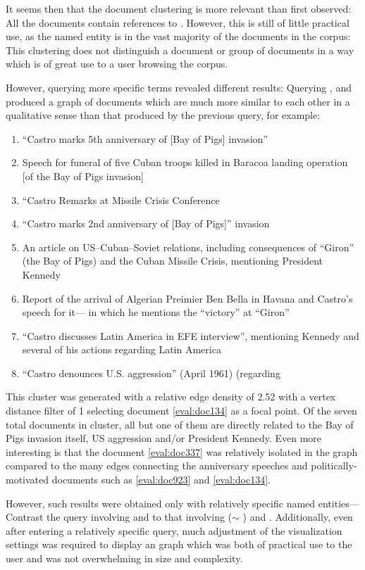 It seems then that the document clustering is more relevant than first observed: All the documents contain references to . However, this is still of little practical use, as the named entity  is in the vast majority of the documents in the corpus: This clustering does not distinguish a document or group of documents in a way which is of great use to a user browsing the corpus.

However, querying more specific terms revealed different results: Querying , and  produced a graph of documents which are much more similar to each other in a qualitative sense than that produced by the previous query, for example:

\begin{enumerate}
\item ``Castro marks 5th anniversary of [Bay of Pigs] invasion'' \label{eval:doc274}
\item Speech for funeral of five Cuban troops killed in Baracoa landing operation [of the Bay of Pigs invasion]\label{eval:doc337}
\item ``Castro Remarks at Missile Crisis Conference\label{eval:doc1418}
\item ``Castro marks 2nd anniversary of [Bay of Pigs]'' invasion \label{eval:doc210}
\item An article on US--Cuban--Soviet relations, including consequences of ``Giron'' (the Bay of Pigs) and the Cuban Missile Crisis, mentioning President Kennedy\label{eval:doc864}
\item Report of the arrival of Algerian Preimier Ben Bella in Havana and Castro's speech for it--- in which he mentions the ``victory'' at ``Giron''
\item ``Castro discusses Latin America in EFE interview'', mentioning Kennedy and several of his actions regarding Latin America \label{eval:doc923}
\item ``Castro denounces U.S. aggression'' (April 1961) \label{eval:doc134} (regarding 
\end{enumerate} 

This cluster was generated with a relative edge density of 2.52 with a vertex distance filter of 1 selecting document \ref{eval:doc134} as a focal point. Of the seven total documents in cluster, all but one of them are directly related to the Bay of Pigs invasion itself, US aggression and/or President Kennedy. Even more interesting is that the document \ref{eval:doc337} was relatively isolated in the graph compared to the many edges connecting the anniversary speeches and politically-motivated documents such as \ref{eval:doc923} and \ref{eval:doc134}.

However, such results were obtained only with relatively specific named entities--- Contrast the query involving  and  to that involving  ($\sim$ )  and . Additionally, even after entering a relatively specific query, much adjustment of the visualization settings was required to display an graph which was both of practical use to the user and was not overwhelming in size and complexity.